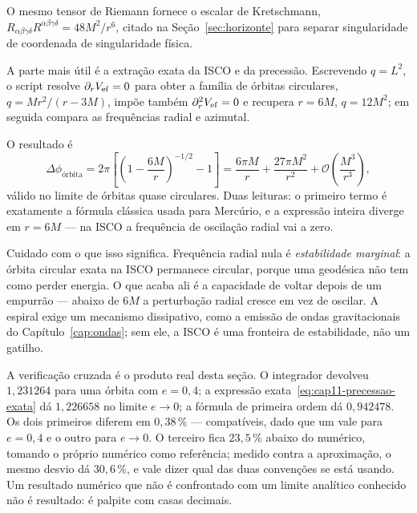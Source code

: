 O mesmo tensor de Riemann fornece o escalar de Kretschmann,
$R_{\alpha\beta\gamma\delta}R^{\alpha\beta\gamma\delta} = 48M^{2}/r^{6}$,
citado na Seção~\ref{sec:horizonte} para separar singularidade de coordenada
de singularidade física.

A parte mais útil é a extração exata da ISCO e da precessão. Escrevendo
$q = L^{2}$, o script resolve $\partial_rV_{\mathrm{ef}}=0$ para obter a família de
órbitas circulares, $q = Mr^{2}/(r-3M)$, impõe também $\partial_r^2V_{\mathrm{ef}}=0$
e recupera $r=6M$, $q=12M^{2}$; em seguida compara as frequências radial e
azimutal.

O resultado é
\begin{equation}
  \Delta\phi_{\text{órbita}}
  = 2\pi\left[\left(1 - \frac{6M}{r}\right)^{-1/2} - 1\right]
  = \frac{6\pi M}{r} + \frac{27\pi M^{2}}{r^{2}} + \mathcal{O}\!\left(\frac{M^{3}}{r^{3}}\right),
  \label{eq:cap11-precessao-exata}
\end{equation}
válido no limite de órbitas quase circulares. Duas leituras: o primeiro termo
é exatamente a fórmula clássica usada para Mercúrio, e a expressão inteira
diverge em $r = 6M$ --- na ISCO a frequência de oscilação radial vai a zero.

Cuidado com o que isso significa. Frequência radial nula é
\emph{estabilidade marginal}: a órbita circular exata na ISCO permanece
circular, porque uma geodésica não tem como perder energia. O que acaba ali é
a capacidade de voltar depois de um empurrão --- abaixo de $6M$ a perturbação
radial cresce em vez de oscilar. A espiral exige um mecanismo dissipativo,
como a emissão de ondas gravitacionais do Capítulo~\ref{cap:ondas}; sem ele,
a ISCO é uma fronteira de estabilidade, não um gatilho.

\begin{central}
A verificação cruzada é o produto real desta seção. O integrador devolveu
$1{,}231264$ para uma órbita com $e = 0{,}4$; a expressão
exata~\eqref{eq:cap11-precessao-exata} dá $1{,}226658$ no limite $e \to 0$; a
fórmula de primeira ordem dá $0{,}942478$. Os dois primeiros diferem em
$0{,}38\,\%$ --- compatíveis, dado que um vale para $e = 0{,}4$ e o outro
para $e \to 0$. O terceiro fica $23{,}5\,\%$ abaixo do numérico, tomando o
próprio numérico como referência; medido contra a aproximação, o mesmo
desvio dá $30{,}6\,\%$, e vale dizer qual das duas convenções se está
usando. Um resultado numérico que
não é confrontado com um limite analítico conhecido não é resultado: é
palpite com casas decimais.
\end{central}

